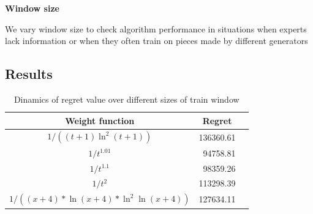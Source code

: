 \documentclass[12pt, twoside]{article}
\begin{document}
\textbf{Window size}

\hspace*{3mm} We vary window size to check algorithm performance in situations when experts lack information or when they often train on pieces made by different generators

\subsection{Results}




\begin{table}[h]

\centering

\begin{tabular}{ccr}

\toprule
Weight function & Regret \\
\midrule
$1 / ((t+1)\ln^2(t+1))$   & 136360.61 \\
$1 / t^{1.01}$  &\ 94758.81 \\
 $1 / t^{1.1}$&\ 98359.26 \\
$1 / t^{2}$ & 113298.39 \\
$1 / ((x + 4) * \ln(x + 4) * \ln^2\ln(x + 4)) $  & 127634.11 \\
\bottomrule
\end{tabular}


%

\caption{Dinamics of regret value over different sizes of train window} \hspace{16cm}
\end{table}
\end{document}
